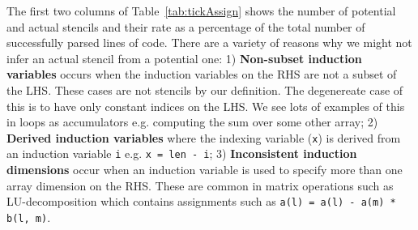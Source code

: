 \documentclass[9pt]{sigplanconf}
\theoremstyle{definition}
\begin{document}
The first two columns of Table~\ref{tab:tickAssign} shows the number
of potential and actual stencils and their rate as a percentage of the
total number of successfully parsed lines of code. There are a variety
of reasons why we might not infer an actual stencil from a potential
one: 1) \textbf{Non-subset induction variables} occurs when the
induction variables on the RHS are not a subset of the LHS. These
cases are not stencils by our definition. The degenereate case of this
is to have only constant indices on the LHS. We see lots of examples
of this in loops as accumulators e.g. computing the sum over some
other array; 2) \textbf{Derived induction variables} where the
indexing variable (\texttt{x}) is derived from an
induction variable \texttt{i} e.g. \texttt{x
  = len - i}; 3) \textbf{Inconsistent induction dimensions} occur when
an induction variable is used to specify more than one array dimension
on the RHS. These are common in matrix operations such as
LU-decomposition which contains assignments such as
\texttt{a(l) = a(l) - a(m) * b(l, m)}.




\end{document}
